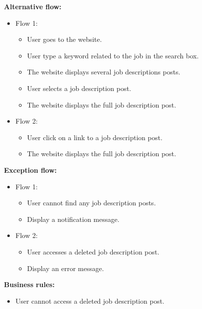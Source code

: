 \documentclass[a4paper]{article}
\begin{document}
        \textbf{Alternative flow:}
        \begin{itemize}
            \item Flow 1:
            \begin{itemize}
                \item User goes to the website.
                \item User type a keyword related to the job in the search box.
                \item The website displays several job descriptions posts.
                \item User selects a job description post.
                \item The website displays the full job description post.
            \end{itemize}
            \item Flow 2:
            \begin{itemize}
                \item User click on a link to a job description post.
                \item The website displays the full job description post.
            \end{itemize}
        \end{itemize}

        \textbf{Exception flow:}
        \begin{itemize}
            \item Flow 1:
            \begin{itemize}
                \item User cannot find any job description posts.
                \item Display a notification message.
            \end{itemize}
            \item Flow 2:
            \begin{itemize}
                \item User accesses a deleted job description post.
                \item Display an error message.
            \end{itemize}
        \end{itemize}

        \textbf{Business rules:}
        \begin{itemize}
            \item User cannot access a deleted job description post.
        \end{itemize}
\end{document}

